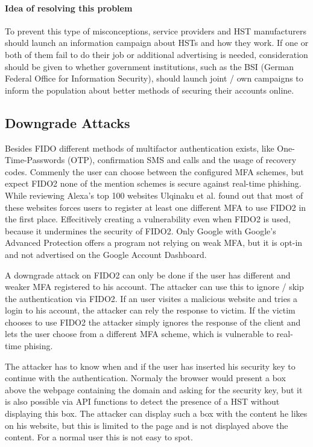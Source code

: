 \documentclass[runningheads]{llncs}
\begin{document}
\paragraph{Idea of resolving this problem}
To prevent this type of misconceptions, service providers and HST manufacturers should launch an information campaign about HSTs and how they work. 
If one or both of them fail to do their job or additional advertising is needed, consideration should be given to whether government institutions, such as the BSI (German Federal Office for Information Security), should launch joint / own campaigns to inform the population about better methods of securing their accounts online.

\subsection{Downgrade Attacks}
Besides FIDO different methods of multifactor authentication exists, like One-Time-Passwords (OTP), confirmation SMS and calls and the usage of recovery codes. Commenly the user can choose between the configured MFA schemes, but expect FIDO2 none of the mention schemes is secure against real-time phishing. While reviewing Alexa's top 100 websites Ulqinaku et al. found out that most of these websites forces users to register at least one different MFA to use FIDO2 in the first place. Effecitively creating a vulnerability even when FIDO2 is used, because it undermines the security of FIDO2. Only Google with Google's Advanced Protection offers a program not relying on weak MFA, but it is opt-in and not advertised on the Google Account Dashboard.

A downgrade attack on FIDO2 can only be done if the user has different and weaker MFA registered to his account. The attacker can use this to ignore / skip the authentication via FIDO2. If an user visites a malicious website and tries a login to his account, the attacker can rely the response to victim. If the victim chooses to use FIDO2 the attacker simply ignores the response of the client and lets the user choose from a different MFA scheme, which is vulnerable to real-time phising.

The attacker has to know when and if the user has inserted his security key to continue with the authentication. Normaly the browser would present a box above the webpage containing the domain and asking for the security key, but it is also possible via API functions to detect the presence of a HST without displaying this box. The attacker can display such a box with the content he likes on his website, but this is limited to the page and is not displayed above the content. For a normal user this is not easy to spot.\cite{274610}
\end{document}
